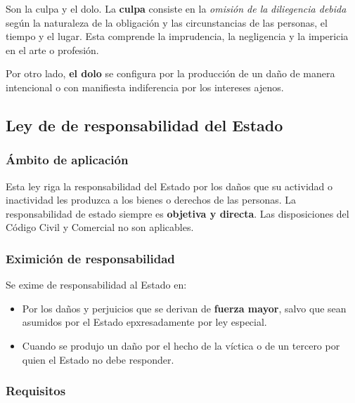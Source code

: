 \documentclass[../resumen.tex]{subfiles}
\begin{document}
Son la culpa y el dolo. La \textbf{culpa} consiste en la \textit{omisión de la}
\textit{diliegencia debida} según la naturaleza de la obligación y las circunstancias
de las personas, el tiempo y el lugar. Esta comprende la imprudencia, la
negligencia y la impericia en el arte o profesión.

Por otro lado, \textbf{el dolo} se configura por la producción de un daño de 
manera intencional o con manifiesta indiferencia por los intereses ajenos.

\subsection{Ley de de responsabilidad del Estado}

\subsubsection{Ámbito de aplicación}

Esta ley riga la responsabilidad del Estado por los daños que su actividad o 
inactividad les produzca a los bienes o derechos de las personas. La responsabilidad
de estado siempre es \textbf{objetiva y directa}. Las disposiciones del Código
Civil y Comercial no son aplicables.

\subsubsection{Eximición de responsabilidad}

Se exime de responsabilidad al Estado en:

\begin{itemize}
  \item Por los daños y perjuicios que se derivan de \textbf{fuerza mayor}, salvo
    que sean asumidos por el Estado epxresadamente por ley especial.
  \item Cuando se produjo un daño por el hecho de la víctica o de un tercero por
    quien el Estado no debe responder.
\end{itemize}

\subsubsection{Requisitos}
\end{document}
